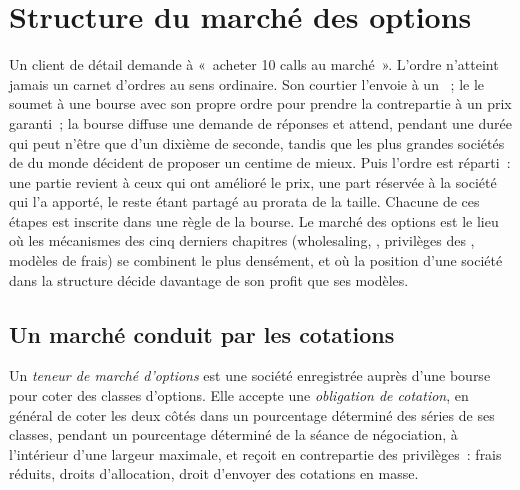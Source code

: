 \chapter{Structure du marché des options}\label{ch:m1:options-market-structure}

Un client de détail demande à «~acheter 10 calls au marché~». L'ordre n'atteint
jamais un carnet d'ordres au sens ordinaire. Son courtier l'envoie à un
~; le  le soumet à une bourse avec son propre ordre pour prendre
la contrepartie à un prix garanti~; la bourse diffuse une demande de réponses et
attend, pendant une durée qui peut n'être que d'un dixième de seconde, tandis que
les plus grandes sociétés de  du monde décident de proposer un centime de mieux.
Puis l'ordre est réparti~: une partie revient à ceux qui ont amélioré le prix, une part réservée
à la société qui l'a apporté, le reste étant partagé au prorata de la taille.
Chacune de ces étapes est inscrite dans une règle de la bourse. Le marché des options
est le lieu où les mécanismes des cinq derniers chapitres (wholesaling, ,
privilèges des , modèles de frais) se combinent le plus densément,
et où la position d'une société dans la structure décide davantage de son profit
que ses modèles.

\section{Un marché conduit par les cotations}

\begin{definition}\label{def:m1:options-market-structure:mm}
Un \emph{teneur de marché d'options} est une
société enregistrée auprès d'une bourse pour coter des classes d'options. Elle
accepte une \emph{obligation de cotation}, en
général de coter les deux côtés dans un pourcentage déterminé des séries de ses
classes, pendant un pourcentage déterminé de la séance de négociation, à
l'intérieur d'une largeur maximale, et reçoit en contrepartie des privilèges~:
frais réduits, droits d'allocation, droit d'envoyer des cotations en masse.
\end{definition}

